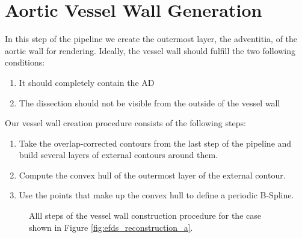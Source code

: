 \documentclass[thesis.tex]{subfiles}
\begin{document}
\section{Aortic Vessel Wall Generation}
In this step of the pipeline we create the outermost layer, the adventitia, of the aortic wall for rendering. Ideally, the vessel wall should fulfill the two following conditions:
\begin{enumerate}
\item{It should completely contain the AD}
\item{The dissection should not be visible from the outside of the vessel wall}
\label{vesselwall_conditions}
\end{enumerate}

Our vessel wall creation procedure consists of the following steps:
\begin{enumerate}
\item{Take the overlap-corrected contours from the last step of the pipeline and build several layers of external contours around them.}
\item{Compute the convex hull of the outermost layer of the external contour.}
\item{Use the points that make up the convex hull to define a periodic B-Spline.}
\end{enumerate}

\begin{figure}[t]
\centering
{}
\caption{Alll steps of the vessel wall construction procedure for the case shown in Figure \ref{fig:efds_reconstruction_a}.}
\label{vesselwall_construction}
\end{figure}
\end{document}
